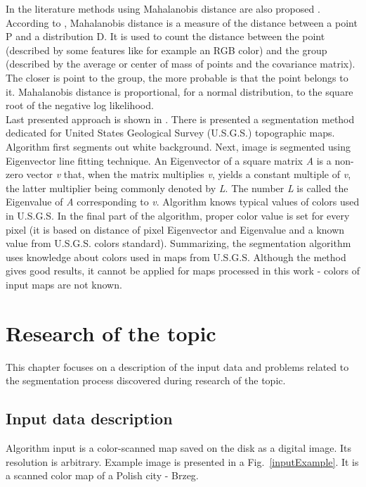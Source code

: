 \documentclass[a4paper,onecolumn,oneside,12pt]{memoir}
\begin{document}
In the literature methods using Mahalanobis distance are also proposed
\cite{mahalanobisConclusionsCite}. According to \cite{mahalanobisWiki}, Mahalanobis distance is a
measure of the distance between a point P and a distribution D. It is used to count the distance
between the point (described by some features like for example an RGB color) and the group
(described by the average or center of mass of points and the covariance matrix). The closer is
point to the group, the more probable is that the point belongs to it. Mahalanobis distance is
proportional, for a normal distribution, to the square root of the negative log likelihood. \\

Last presented approach is shown in \cite{colorMapSegmentation}. There is presented a segmentation
method dedicated for United States Geological Survey (U.S.G.S.) topographic maps. Algorithm first 
segments out white background. Next, image is segmented using Eigenvector line fitting technique.
An Eigenvector of a square matrix \textit{A} \cite{eigenWiki} is a non-zero vector \textit{v} that,
when the matrix multiplies \textit{v}, yields a constant multiple of \textit{v}, the latter
multiplier being commonly denoted by \textit{L}. The number \textit{L} is called the Eigenvalue of
\textit{A} corresponding to \textit{v}. Algorithm knows typical values of colors used in U.S.G.S. In
the final part of the algorithm, proper color value is set for every pixel (it is based on distance
of pixel Eigenvector and Eigenvalue and a known value from U.S.G.S. colors standard). Summarizing,
the segmentation algorithm uses knowledge about colors used in maps from U.S.G.S. Although the
method gives good results, it cannot be applied for maps processed in this work - colors of input
maps are not known.

\chapter{Research of the topic}

This chapter focuses on a description of the input data and problems related to the segmentation
process discovered during research of the topic.

\section{Input data description}

Algorithm input is a color-scanned map saved on the disk as a digital image. Its resolution is
arbitrary. Example image is presented in a Fig.~\ref{inputExample}. It is a scanned color map of a
Polish city - Brzeg.
\end{document}
